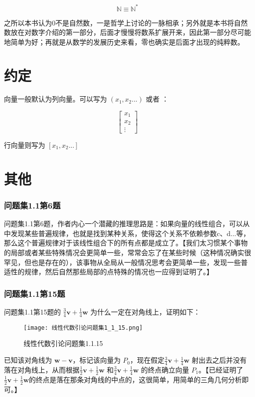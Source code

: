 \documentclass[12pt,oneside]{book}
\begin{document}
\[
\mathbb{N} \equiv \mathbb{N}^{*}
\]

之所以本书认为0不是自然数，一是哲学上讨论的一脉相承；另外就是本书将自然数放在对数字介绍的第一部分，后面才慢慢将数系扩展开来，因此第一部分尽可能地简单为好；再就是从数学的发展历史来看，零也确实是后面才出现的纯粹数。

\chapter{约定}
向量一般默认为列向量。可以写为 $(x_1, x_2...)$ 或者 ：

\[
\begin{bmatrix}x_{1}  \\ x_2 \\ \vdots \end{bmatrix}
\]

行向量则写为 $[x_1, x_2...]$


\chapter{其他}

\subsection{问题集1.1第6题}
\cite{线性代数引论}问题集1.1第6题，作者内心一个潜藏的推理思路是：如果向量的线性组合，可以从中发现某些普遍规律，也就是找到某种关系，使得这个关系不依赖参数c、d...等，那么这个普遍规律对于该线性组合下的所有点都是成立了。【我们太习惯某个事物的局部或者某些特殊情况会更简单一些，常常会忘了在某些时候（这种情况确实很罕见，但也是存在的），该事物从全局从一般情况思考会更简单一些，发现一些普适性的规律，然后自然那些局部的点特殊的情况也一应得到证明了。】

\subsection{问题集1.1第15题}
\cite{线性代数引论}问题集1.1第15题的 $\frac{3}{4}\boldsymbol{v} + \frac{1}{4}\boldsymbol{w}$ 为什么一定在对角线上，证明如下：

\begin{figure}[H]
\centering
\texttt{[image: 线性代数引论问题集1\_1\_15.png]}
\caption{线性代数引论问题集1.1.15}
\end{figure}

已知该对角线为 $\boldsymbol{w} - \boldsymbol{v}$，标记该向量为 $P_0$，现在假定$\frac{3}{4}\boldsymbol{v} + \frac{1}{4}\boldsymbol{w}$ 射出去之后并没有落在对角线上，从而根据$\frac{1}{2}\boldsymbol{v} + \frac{1}{2}\boldsymbol{w}$ 和$\frac{3}{4}\boldsymbol{v} + \frac{1}{4}\boldsymbol{w}$ 的终点确立向量 $P_1$。【已经证明了$\frac{1}{2}\boldsymbol{v} + \frac{1}{2}\boldsymbol{w}$的终点是落在那条对角线的中点的，这很简单，用简单的三角几何分析即可。】
\end{document}
